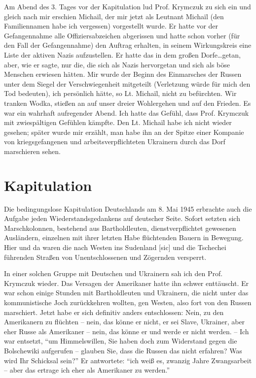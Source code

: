 \documentclass[a5paper,pagesize,10pt,twoside=true]{scrbook}
\renewcommand{\marginpar}[2][]{}
\begin{document}
Am Abend des 3. Tages vor der Kapitulation lud Prof. Krymczuk zu sich ein und gleich nach mir erschien Michaïl, der mir jetzt als Leutnant Michaïl (den Familiennamen habe ich vergessen) vorgestellt wurde. Er hatte vor der Gefangennahme alle Offiziersabzeichen abgerissen und hatte schon vorher (für den Fall der Gefangennahme) den Auftrag erhalten, in seinem Wirkungskreis eine Liste der aktiven Nazis aufzustellen. Er hatte das in dem großen Dorfe\dots getan, aber, wie er sagte, nur die, \marginpar{68} die sich als Nazis hervorgetan und sich als böse Menschen erwiesen hätten. Mir wurde der Beginn des Einmarsches der Russen unter dem Siegel der Verschwiegenheit mitgeteilt (Verletzung würde für mich den Tod bedeuten), ich persönlich hätte, so Lt. Michaïl, nicht zu befürchten. Wir tranken Wodka, stießen an auf unser dreier Wohlergehen und auf den Frieden. Es war ein wahrhaft aufregender Abend. Ich hatte das Gefühl, dass Prof. Krymczuk mit zwiespältigen Gefühlen kämpfte. Den Lt. Michaïl habe ich nicht wieder gesehen; später wurde mir erzählt, man habe ihn an der Spitze einer Kompanie von kriegsgefangenen und arbeitsverpflichteten Ukrainern durch das Dorf marschieren sehen.

\section{Kapitulation}

Die bedingungslose Kapitulation Deutschlands am 8. Mai 1945 erbrachte auch die Aufgabe jeden Wiederstandsgedankens auf deutscher Seite. Sofort setzten sich Marschkolonnen, bestehend aus Bartholdleuten, dienstverpflichtet gewesenen Ausländern, einzelnen mit ihrer letzten Habe flüchtenden Bauern in Bewegung. Hier und da waren die nach Westen ins Sudenland [sic] und die Tschechei führenden Straßen von Unentschlossenen und Zögernden versperrt.

In einer solchen Gruppe mit Deutschen und Ukrainern sah ich den Prof. Krymczuk wieder. \marginpar{69} Das Versagen der Amerikaner hatte ihn schwer enttäuscht. Er war schon einige Stunden mit Bartholdleuten und Ukrainern, die nicht unter das kommunistische Joch zurückkehren wollten, gen Westen, also fort von den Russen marschiert. Jetzt habe er sich definitiv anders entschlossen: Nein, zu den Amerikanern zu flüchten -- nein, das könne er nicht, er sei Slave, Ukrainer, aber eher Russe als Amerikaner -- nein, das könne er und werde er nicht werden. -- Ich war entsetzt, \enquote{um Himmelswillen, Sie haben doch zum Widerstand gegen die Bolschewiki aufgerufen -- glauben Sie, dass die Russen das nicht erfahren? Was wird Ihr Schicksal sein?} Er antwortete: \enquote{ich weiß es, zwanzig Jahre Zwangsarbeit -- aber das ertrage ich eher als Amerikaner zu werden.}
\end{document}
